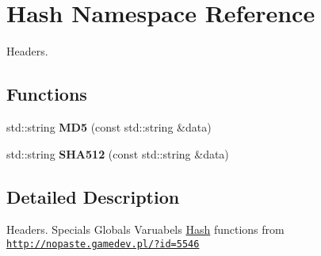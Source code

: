 \hypertarget{namespaceHash}{
\section{Hash Namespace Reference}
\label{namespaceHash}
}


Headers.  


\subsection*{Functions}
\begin{DoxyCompactItemize}
\item 
\hypertarget{namespaceHash_a7afbbfafc36ad2234ab868f3c1922025}{
std::string {\bfseries MD5} (const std::string \&data)}
\label{namespaceHash_a7afbbfafc36ad2234ab868f3c1922025}

\item 
\hypertarget{namespaceHash_ad2302a0ddd0cf8b6b023c0bd1483d162}{
std::string {\bfseries SHA512} (const std::string \&data)}
\label{namespaceHash_ad2302a0ddd0cf8b6b023c0bd1483d162}

\end{DoxyCompactItemize}


\subsection{Detailed Description}
Headers. Specials Globals Varuabels \hyperlink{namespaceHash}{Hash} functions from \href{http://nopaste.gamedev.pl/?id=5546}{\tt http://nopaste.gamedev.pl/?id=5546} 